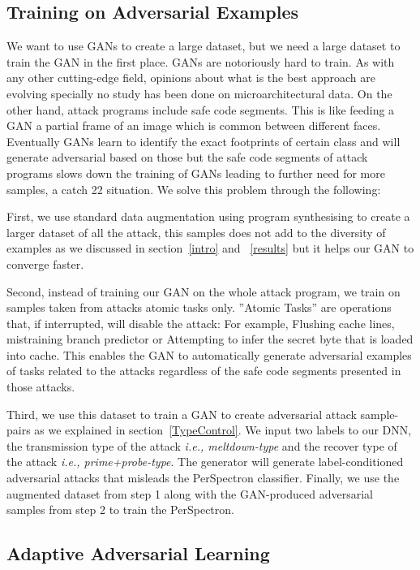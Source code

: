 \subsection{Training on Adversarial Examples}

We want to use GANs to create a large dataset, but we need a large dataset to train the GAN in the first place. GANs are notoriously hard to  train. As with any other cutting-edge field, opinions about what is the best approach are evolving specially no study has been done on microarchitectural data.
On the other hand, attack programs include safe code segments. This is like feeding a GAN a partial frame of an image which is common between different faces. Eventually GANs learn to identify the exact footprints of certain class and will generate adversarial based on those but the safe code segments of attack programs slows down the training of GANs leading to further need for more samples, a catch 22 situation. We solve this problem through the following:


First, we use standard data augmentation using program synthesising to create a larger dataset of all the attack, this samples does not add to the diversity of examples as we discussed in section~\ref{intro} and ~\ref{results} but it helps our GAN to converge faster. 

Second, instead of training our GAN on the whole attack program, we train on samples taken from attacks atomic tasks only.  ”Atomic
Tasks” are operations that, if interrupted, will disable the attack: For example, Flushing cache lines, mistraining branch predictor  or
Attempting to infer the secret byte that is loaded into cache.
This enables the GAN to automatically generate adversarial examples of tasks related to the attacks regardless of the safe code segments presented in those attacks.

Third, we use this dataset to train a GAN to create adversarial attack sample-pairs as we explained in section~\ref{TypeControl}. We input two labels to our DNN, the transmission type of the attack {\em i.e., meltdown-type } and the recover type of the attack {\em i.e., prime+probe-type}. The generator will generate label-conditioned adversarial attacks that misleads the PerSpectron classifier. 
Finally, we use the augmented dataset from step 1 along with the GAN-produced adversarial samples from step 2 to train the PerSpectron. 

 

  

 
\subsection{Adaptive Adversarial Learning}

